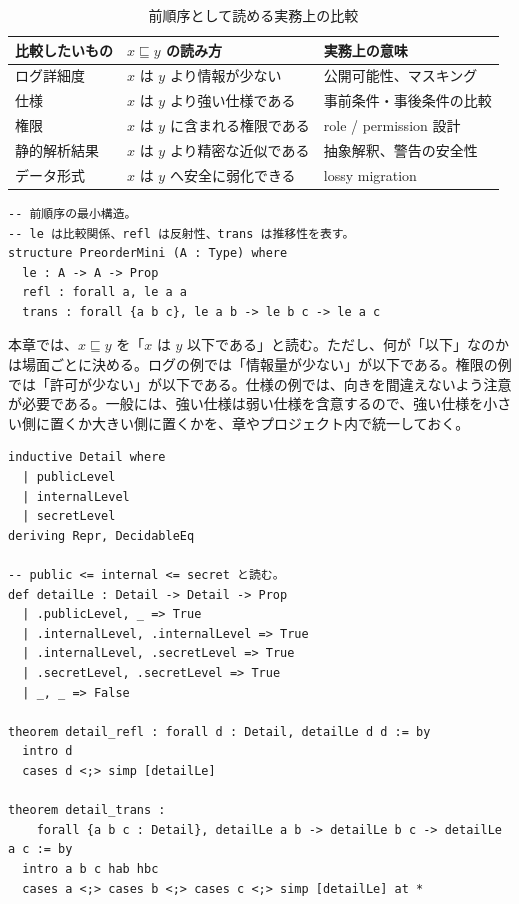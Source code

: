 \begin{table}[htbp]
\centering
\caption{前順序として読める実務上の比較}
\label{tab:ch16-preorder-examples}
\begin{tabular}{lll}
\toprule
比較したいもの & \(x \sqsubseteq y\) の読み方 & 実務上の意味 \\
\midrule
ログ詳細度 & \(x\) は \(y\) より情報が少ない & 公開可能性、マスキング \\
仕様 & \(x\) は \(y\) より強い仕様である & 事前条件・事後条件の比較 \\
権限 & \(x\) は \(y\) に含まれる権限である & role / permission 設計 \\
静的解析結果 & \(x\) は \(y\) より精密な近似である & 抽象解釈、警告の安全性 \\
データ形式 & \(x\) は \(y\) へ安全に弱化できる & lossy migration \\
\bottomrule
\end{tabular}
\end{table}

\begin{listing}[htbp]
\begin{verbatim}
-- 前順序の最小構造。
-- le は比較関係、refl は反射性、trans は推移性を表す。
structure PreorderMini (A : Type) where
  le : A -> A -> Prop
  refl : forall a, le a a
  trans : forall {a b c}, le a b -> le b c -> le a c
\end{verbatim}
\caption{前順序の最小定義}
\label{lst:ch16-preorder-mini}
\end{listing}

本章では、\(x \sqsubseteq y\) を「\(x\) は \(y\) 以下である」と読む。ただし、何が「以下」なのかは場面ごとに決める。ログの例では「情報量が少ない」が以下である。権限の例では「許可が少ない」が以下である。仕様の例では、向きを間違えないよう注意が必要である。一般には、強い仕様は弱い仕様を含意するので、強い仕様を小さい側に置くか大きい側に置くかを、章やプロジェクト内で統一しておく。


\begin{listing}[htbp]
\begin{verbatim}
inductive Detail where
  | publicLevel
  | internalLevel
  | secretLevel
deriving Repr, DecidableEq

-- public <= internal <= secret と読む。
def detailLe : Detail -> Detail -> Prop
  | .publicLevel, _ => True
  | .internalLevel, .internalLevel => True
  | .internalLevel, .secretLevel => True
  | .secretLevel, .secretLevel => True
  | _, _ => False

theorem detail_refl : forall d : Detail, detailLe d d := by
  intro d
  cases d <;> simp [detailLe]

theorem detail_trans :
    forall {a b c : Detail}, detailLe a b -> detailLe b c -> detailLe a c := by
  intro a b c hab hbc
  cases a <;> cases b <;> cases c <;> simp [detailLe] at *
\end{verbatim}
\caption{ログ詳細度の前順序}
\label{lst:ch16-detail-preorder}
\end{listing}

